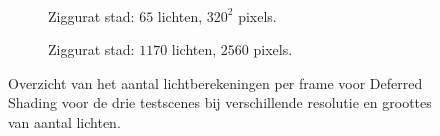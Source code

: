 \begin{figure}[t]
\begin{adjustbox}{minipage=\textwidth, scale=0.55}
\begin{subfigure}[b]{0.8\textwidth}
      \label{fig:ts-lc-frames-deferred:alley-high}
    \end{subfigure}
  \end{adjustbox} \\
  \begin{adjustbox}{minipage=\textwidth, scale=0.55}
    \begin{subfigure}[b]{0.8\textwidth}
      \centering
      \def\svgwidth{\textwidth}
      
      \caption{Ziggurat stad: $65$ lichten, $320^2$ pixels.}
      \label{fig:ts-lc-frames-deferred:city-low}
    \end{subfigure}
  \end{adjustbox}\hspace{-0.075\textwidth}  %
  \begin{adjustbox}{minipage=\textwidth, scale=0.55}
    \begin{subfigure}[b]{0.8\textwidth}
      \centering
      \def\svgwidth{\textwidth}
      
      \caption{Ziggurat stad: $1170$ lichten, $2560$ pixels.}
      \label{fig:ts-lc-frames-deferred:city-high}
    \end{subfigure}
  \end{adjustbox}
  \caption{Overzicht van het aantal lichtberekeningen per frame voor Deferred Shading
           voor de drie testscenes bij verschillende resolutie en groottes van aantal
           lichten.}
  \label{fig:ts-lc-frames-deferred}
\end{figure}

